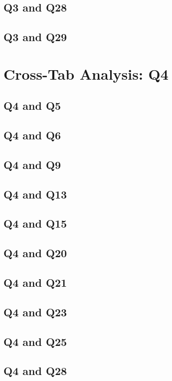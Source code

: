 \documentclass{report}
\begin{document}
\section{Q3 and Q28}\clearpage
\section{Q3 and Q29}\clearpage

\chapter{Cross-Tab Analysis: Q4}

\section{Q4 and Q5}\clearpage
\section{Q4 and Q6}\clearpage
\section{Q4 and Q9}\clearpage
\section{Q4 and Q13}\clearpage
\section{Q4 and Q15}\clearpage
\section{Q4 and Q20}\clearpage
\section{Q4 and Q21}\clearpage
\section{Q4 and Q23}\clearpage
\section{Q4 and Q25}\clearpage
\section{Q4 and Q28}\clearpage
\end{document}

